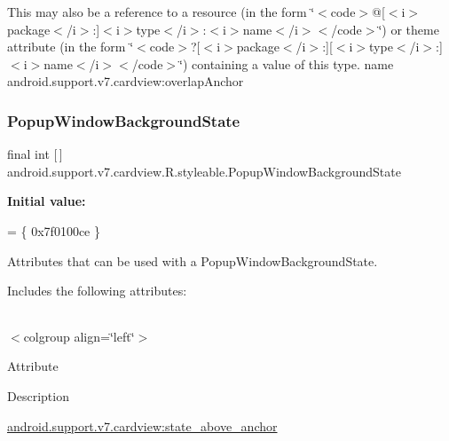 This may also be a reference to a resource (in the form \char`\"{}$<$code$>$@\mbox{[}$<$i$>$package$<$/i$>$\+:\mbox{]}$<$i$>$type$<$/i$>$\+:$<$i$>$name$<$/i$>$$<$/code$>$\char`\"{}) or theme attribute (in the form \char`\"{}$<$code$>$?\mbox{[}$<$i$>$package$<$/i$>$\+:\mbox{]}\mbox{[}$<$i$>$type$<$/i$>$\+:\mbox{]}$<$i$>$name$<$/i$>$$<$/code$>$\char`\"{}) containing a value of this type.  name android.\+support.\+v7.\+cardview\+:overlap\+Anchor \mbox{\label{classandroid_1_1support_1_1v7_1_1cardview_1_1R_1_1styleable_aa90cb6768345b77eef33904f63e11b51}} 
\subsubsection{\texorpdfstring{Popup\+Window\+Background\+State}{PopupWindowBackgroundState}}
{\footnotesize\ttfamily final int \mbox{[}$\,$\mbox{]} android.\+support.\+v7.\+cardview.\+R.\+styleable.\+Popup\+Window\+Background\+State\hspace{0.3cm}{\ttfamily [static]}}

{\bfseries Initial value\+:}
\begin{DoxyCode}
= \{
            0x7f0100ce
        \}
\end{DoxyCode}
Attributes that can be used with a Popup\+Window\+Background\+State. 

Includes the following attributes\+:

\tabulinesep=1mm
\begin{longtabu} spread 0pt [c]{*{0}{|X[-1]}|}
\hline
\end{longtabu}
$<$colgroup align=\char`\"{}left\char`\"{}$>$ 

Attribute

Description 

{\ttfamily \hyperlink{classandroid_1_1support_1_1v7_1_1cardview_1_1R_1_1styleable_ad3945523bf49bb5463a2804bc26c1f48}{android.\+support.\+v7.\+cardview\+:state\+\_\+above\+\_\+anchor}}

